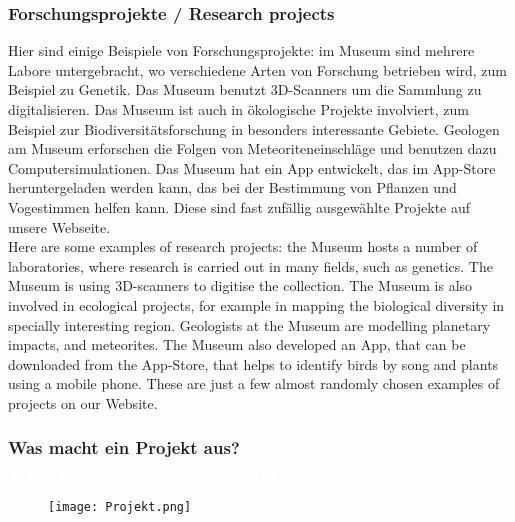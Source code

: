 \documentclass[12pt]{beamer}
\begin{document}
{\scriptsize
\begin{frame}
  \frametitle{Forschungsprojekte / \textcolor{mfn_green}{Research projects}}
  Hier sind einige Beispiele von Forschungsprojekte: im Museum sind mehrere Labore untergebracht, wo verschiedene Arten von Forschung betrieben wird, zum Beispiel zu Genetik. Das Museum benutzt 3D-Scanners um die Sammlung zu digitalisieren. Das Museum ist auch in ökologische Projekte involviert, zum Beispiel zur Biodiversitätsforschung in besonders interessante Gebiete. Geologen am Museum erforschen die Folgen von Meteoriteneinschläge und benutzen dazu Computersimulationen. Das Museum hat ein App entwickelt, das im App-Store heruntergeladen werden kann, das bei der Bestimmung von Pflanzen und Vogestimmen helfen kann. Diese sind fast zufällig ausgewählte Projekte auf unsere Webseite.\\
  \bigskip
  \textcolor{mfn_green}{Here are some examples of research projects: the Museum hosts a number of laboratories, where research is carried out in many fields, such as genetics. The Museum is using 3D-scanners to digitise the collection. The Museum is also involved in ecological projects, for example in mapping the biological diversity in specially interesting region. Geologists at the Museum are modelling planetary impacts, and meteorites. The Museum also developed an App, that can be downloaded from the App-Store, that helps to identify birds by song and plants using a mobile phone. These are just a few almost randomly chosen examples of projects on our Website.}
\end{frame}
}
{
\begin{frame}
  \frametitle{Was macht ein Projekt aus? \\ \textcolor{white}{What does it take to launch a project?}}
  \begin{figure}
  \texttt{[image: Projekt.png]}
  \end{figure}
  \bigskip
\end{frame}
}
\end{document}
